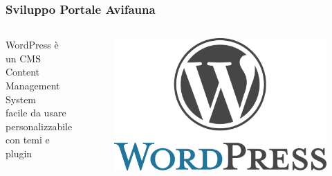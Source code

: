 \documentclass{beamer}
\def \sv {Sviluppo Portale Avifauna}
\def \wp {WordPress}
\begin{document}
\begin{frame}
 \frametitle{\sv}
 \begin{center}
  \begin{columns}
   \begin{center}
     {\wp} è un CMS \\
     Content Management System \\
     facile da usare \\
     personalizzabile con temi e plugin
   \end{center}
   \begin{figure}
     \includegraphics[scale=0.12]{images/wordpress}
   \end{figure}
  \end{columns}
 \end{center}
\end{frame}
\end{document}
